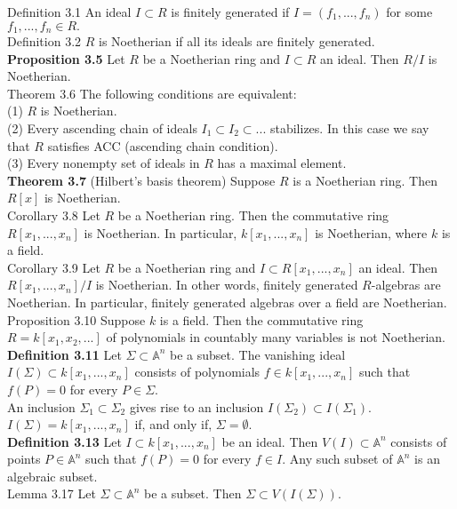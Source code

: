 \documentclass[8pt]{extarticle}
\begin{document}
Definition 3.1 An ideal $I \subset R$ is finitely generated if $I = (f_1,...,f_n)$ for some $f_1,...,f_n \in R.$\\
Definition 3.2 $R$ is Noetherian if all its ideals are finitely generated.\\
\textbf{Proposition 3.5} Let $R$ be a Noetherian ring and $I \subset R$ an ideal. Then $R/I$ is Noetherian.\\
Theorem 3.6 The following conditions are equivalent:\\
(1) $R$ is Noetherian.\\
(2) Every ascending chain of ideals $I_1 \subset I_2 \subset...$ stabilizes. In this case we say that $R$ satisfies ACC (ascending chain condition).\\
(3) Every nonempty set of ideals in $R$ has a maximal element.\\
\textbf{Theorem 3.7} (Hilbert’s basis theorem) Suppose $R$ is a Noetherian ring. Then $R[x]$ is Noetherian.\\
Corollary 3.8 Let $R$ be a Noetherian ring. Then the commutative ring $R[x_1,..., x_n]$ is Noetherian. In
particular, $k[x_1,..., x_n]$ is Noetherian, where $k$ is a field.\\
Corollary 3.9 Let $R$ be a Noetherian ring and $I\subset R[x_1,...,x_n]$ an ideal. Then $R[x_1,...,x_n]/I$ is Noetherian. In other words, finitely generated $R$-algebras are Noetherian. In particular, finitely generated algebras over a field are Noetherian.\\
Proposition 3.10 Suppose $k$ is a field. Then the commutative ring $R = k[x_1,x_2,...]$ of polynomials in countably many variables is not Noetherian.\\
\textbf{Definition 3.11} Let $\Sigma \subset \mathbb{A}^n$ be a subset. The vanishing ideal $I(\Sigma) \subset k[x_1,..., x_n]$ consists of polynomials $f \in k[x_1,...,x_n]$ such that $f(P) = 0$ for every $P \in \Sigma.$\\
An inclusion $\Sigma_1 \subset \Sigma_2$ gives rise to an inclusion $I(\Sigma_2) \subset I(\Sigma_1).$\\
$I(\Sigma) = k[x_1,...,x_n]$ if, and only if, $\Sigma = \emptyset.$\\
\textbf{Definition 3.13} Let $I \subset k[x_1,..., x_n]$ be an ideal. Then $V(I) \subset \mathbb{A}^n$ consists of points $P \in \mathbb{A}^n$ such that $f(P) = 0$ for every $f \in I.$ Any such subset of $\mathbb{A}^n$ is an algebraic subset.\\
Lemma 3.17 Let $\Sigma \subset \mathbb{A}^n$ be a subset. Then $\Sigma\subset V(I(\Sigma)).$\\
\end{document}
